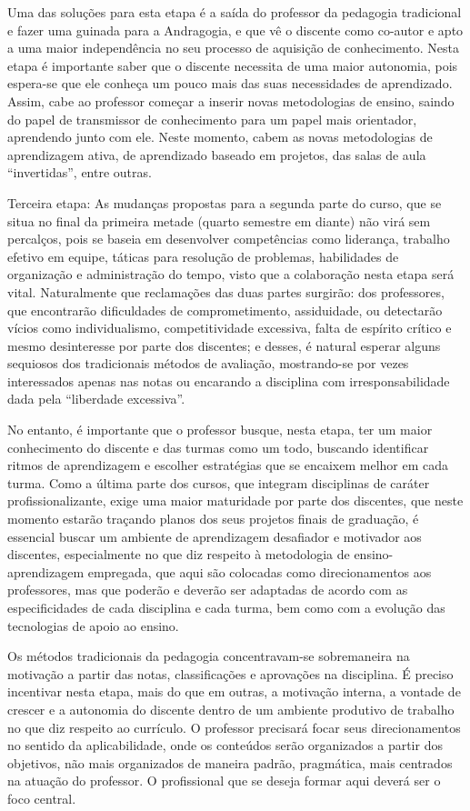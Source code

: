 \documentclass[
	12pt,				%
	openright,			%
	oneside,			%
	a4paper,			%
	english,			%
	brazil				%
	]{abntex2}
\begin{document}
Uma das soluções para esta etapa é a saída do professor da pedagogia tradicional e fazer uma guinada para a Andragogia, e que vê o discente como co-autor e apto a uma maior independência no seu processo de aquisição de conhecimento. Nesta etapa é importante saber que o discente necessita de uma maior autonomia, pois espera-se que ele conheça um pouco mais das suas necessidades de aprendizado. Assim, cabe ao professor começar a inserir novas metodologias de ensino, saindo do papel de transmissor de conhecimento para um papel mais orientador, aprendendo junto com ele. Neste momento, cabem as novas metodologias de aprendizagem ativa, de aprendizado baseado em projetos, das salas de aula “invertidas”, entre outras.

Terceira etapa: As mudanças propostas para a segunda parte do curso, que se situa no final da primeira metade (quarto semestre em diante) não virá sem percalços, pois se baseia em desenvolver competências como liderança, trabalho efetivo em equipe, táticas para resolução de problemas, habilidades de organização e administração do tempo, visto que a colaboração nesta etapa será vital. Naturalmente que reclamações das duas partes surgirão: dos professores, que encontrarão dificuldades de comprometimento, assiduidade, ou detectarão vícios como individualismo, competitividade excessiva, falta de espírito crítico e mesmo desinteresse por parte dos discentes; e desses, é natural esperar alguns sequiosos dos tradicionais métodos de avaliação, mostrando-se por vezes interessados apenas nas notas ou encarando a disciplina com irresponsabilidade dada pela ``liberdade excessiva''.

No entanto, é importante que o professor busque, nesta etapa, ter um maior conhecimento do discente e das turmas como um todo, buscando identificar ritmos de aprendizagem e escolher estratégias que se encaixem melhor em cada turma. Como a última parte dos cursos, que integram disciplinas de caráter profissionalizante, exige uma maior maturidade por parte dos discentes, que neste momento estarão traçando planos dos seus projetos finais de graduação, é essencial buscar um ambiente de aprendizagem desafiador e motivador aos discentes, especialmente no que diz respeito à metodologia de ensino-aprendizagem empregada, que aqui são colocadas como direcionamentos aos professores, mas que poderão e deverão ser adaptadas de acordo com as especificidades de cada disciplina e cada turma, bem como com a evolução das tecnologias de apoio ao ensino.

Os métodos tradicionais da pedagogia concentravam-se sobremaneira na motivação a partir das notas, classificações e aprovações na disciplina. É preciso incentivar nesta etapa, mais do que em outras, a motivação interna, a vontade de crescer e a autonomia do discente dentro de um ambiente produtivo de trabalho no que diz respeito ao currículo. O professor precisará focar seus direcionamentos no sentido da aplicabilidade, onde os conteúdos serão organizados a partir dos objetivos, não mais organizados de maneira padrão, pragmática, mais centrados na atuação do professor. O profissional que se deseja formar aqui deverá ser o foco central.
\end{document}
